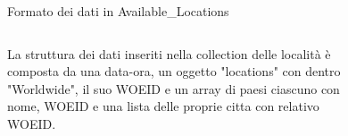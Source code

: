 \documentclass[xcolor=svgnames, aspectratio=169]{beamer}
\begin{document}
\begin{frame}{Formato dei dati in Available\_Locations}
    \begin{columns}[t]
        \vspace*{32pt}
        
        La struttura dei dati inseriti nella collection delle località è composta da una data-ora, un oggetto "locations" con dentro "Worldwide", il suo WOEID e un array di paesi ciascuno con nome, WOEID e una lista delle proprie citta con relativo WOEID.
        
        \vspace*{-45pt}
        \begin{figure}[H]
            \centering
            \noindent{}
        \end{figure}
    \end{columns}
\end{frame}

\end{document}
